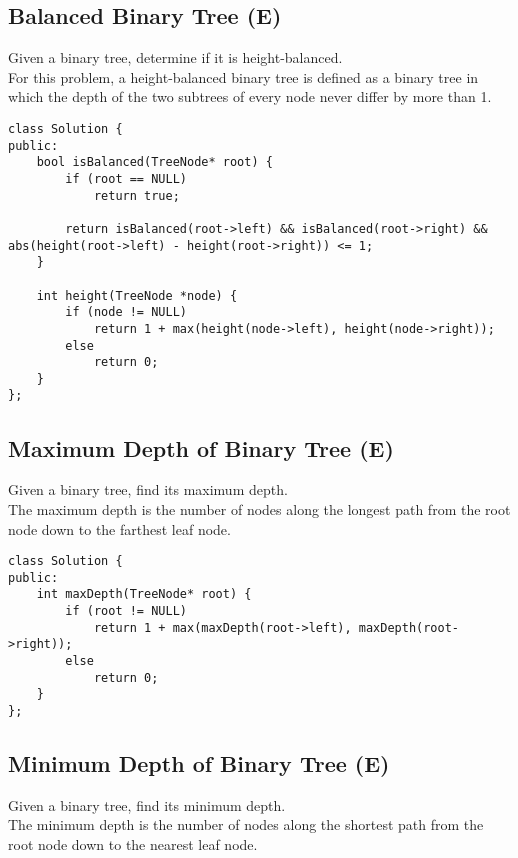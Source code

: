 \subsection{Balanced Binary Tree (E)}
Given a binary tree, determine if it is height-balanced.\\

For this problem, a height-balanced binary tree is defined as a binary tree in which the depth of the two subtrees of every node never differ by more than 1. \\
\begin{lstlisting}
class Solution {
public:
    bool isBalanced(TreeNode* root) {
        if (root == NULL)
            return true;
            
        return isBalanced(root->left) && isBalanced(root->right) && abs(height(root->left) - height(root->right)) <= 1;
    }
    
    int height(TreeNode *node) {
        if (node != NULL)
            return 1 + max(height(node->left), height(node->right));
        else
            return 0;
    }
};
\end{lstlisting}


\subsection{Maximum Depth of Binary Tree (E)}
Given a binary tree, find its maximum depth.\\

The maximum depth is the number of nodes along the longest path from the root node down to the farthest leaf node.\\

\begin{lstlisting}
class Solution {
public:
    int maxDepth(TreeNode* root) {
        if (root != NULL)
            return 1 + max(maxDepth(root->left), maxDepth(root->right));
        else
            return 0;
    }
};
\end{lstlisting}


\subsection{Minimum Depth of Binary Tree (E)}
Given a binary tree, find its minimum depth.\\

The minimum depth is the number of nodes along the shortest path from the root node down to the nearest leaf node.\\

